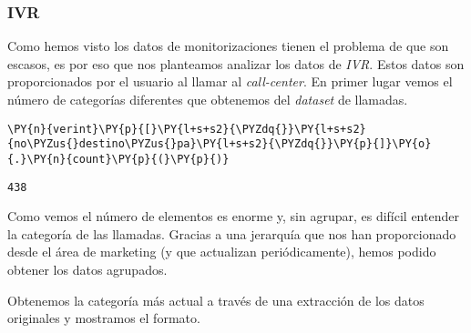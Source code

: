    \hypertarget{ivr}{%
\subsubsection{IVR}\label{ivr}}

    Como hemos visto los datos de monitorizaciones tienen el problema de que
son escasos, es por eso que nos planteamos analizar los datos de \textit{IVR}.
Estos datos son proporcionados por el usuario al llamar al \emph{call-center}. En primer lugar vemos el número de categorías diferentes que obtenemos del \textit{dataset} de llamadas.

\vspace{0.5cm}

    \begin{tcolorbox}[breakable, size=fbox, boxrule=1pt, pad at break*=1mm,colback=cellbackground, colframe=cellborder]
\begin{Verbatim}[commandchars=\\\{\}]
\PY{n}{verint}\PY{p}{[}\PY{l+s+s2}{\PYZdq{}}\PY{l+s+s2}{no\PYZus{}destino\PYZus{}pa}\PY{l+s+s2}{\PYZdq{}}\PY{p}{]}\PY{o}{.}\PY{n}{count}\PY{p}{(}\PY{p}{)}
\end{Verbatim}
\end{tcolorbox}

            \begin{tcolorbox}[breakable, size=fbox, boxrule=.5pt, pad at break*=1mm, opacityfill=0]
\begin{Verbatim}[commandchars=\\\{\}]
438
\end{Verbatim}
\end{tcolorbox}
        
    Como vemos el número de elementos es enorme y, sin agrupar, es difícil entender la categoría de las llamadas. Gracias a una jerarquía que nos han proporcionado desde el área de marketing (y que actualizan periódicamente), hemos podido obtener los datos agrupados. 
    
    Obtenemos la categoría más actual a través de una extracción de los datos originales y mostramos el formato.
    
    \vspace{0.5cm}

